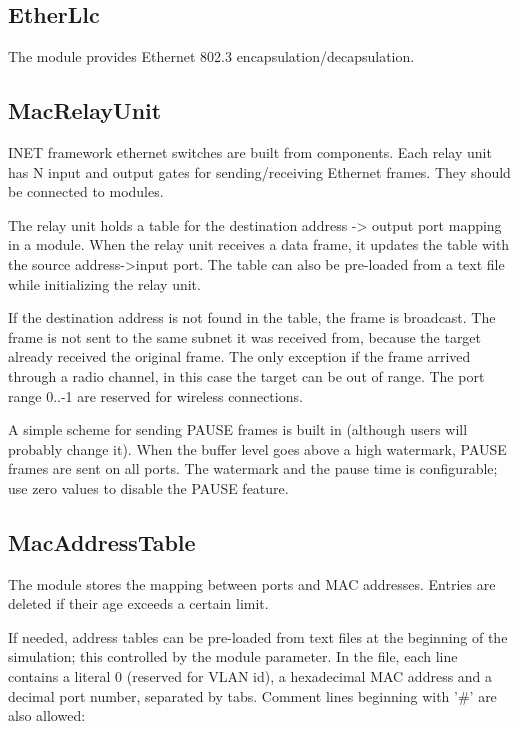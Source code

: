 \subsection{EtherLlc}

The  module provides Ethernet 802.3
encapsulation/decapsulation.

\subsection{MacRelayUnit}

INET framework ethernet switches are built from 
components. Each relay unit has N input and output gates for sending/receiving
Ethernet frames. They should be connected to  modules.

The relay unit holds a table for the destination address -> output port mapping
in a  module.  When the relay unit receives a data frame, it
updates the table with the source address->input port. The table can also be
pre-loaded from a text file while initializing the relay unit.

If the destination address is not found in the table, the frame is broadcast.
The frame is not sent to the same subnet it was received from, because the
target already received the original frame. The only exception if the frame
arrived through a radio channel, in this case the target can be out of range.
The port range 0..-1 are reserved for wireless connections.

A simple scheme for sending PAUSE frames is built in (although
users will probably change it). When the buffer level goes
above a high watermark, PAUSE frames are sent on all ports.
The watermark and the pause time is configurable; use zero
values to disable the PAUSE feature.

\subsection{MacAddressTable}

The  module stores the mapping between ports and MAC addresses.
Entries are deleted if their age exceeds a certain limit.

If needed, address tables can be pre-loaded from text files at the beginning of
the simulation; this controlled by the  module parameter.
In the file, each line contains a literal 0 (reserved for VLAN id), a hexadecimal
MAC address and a decimal port number, separated by tabs. Comment lines
beginning with '\#' are also allowed:

